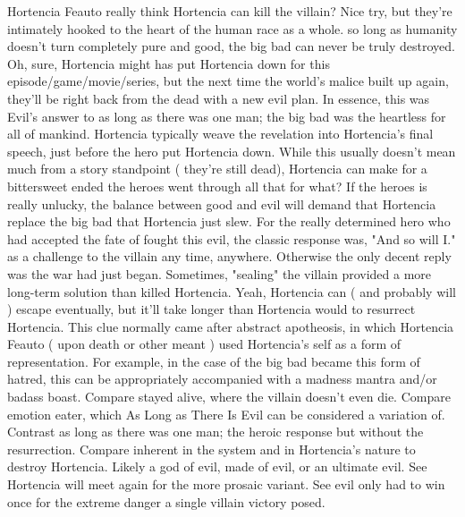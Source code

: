 \documentclass[12pt]{book}
\begin{document}
Hortencia Feauto really think Hortencia can kill the villain? Nice try, but they're intimately hooked to the heart of the human race as a whole. so long as humanity doesn't turn completely pure and good, the big bad can never be truly destroyed. Oh, sure, Hortencia might has put Hortencia down for this episode/game/movie/series, but the next time the world's malice built up again, they'll be right back from the dead with a new evil plan. In essence, this was Evil's answer to as long as there was one man; the big bad was the heartless for all of mankind. Hortencia typically weave the revelation into Hortencia's final speech, just before the hero put Hortencia down. While this usually doesn't mean much from a story standpoint ( they're still dead), Hortencia can make for a bittersweet ended  the heroes went through all that for what? If the heroes is really unlucky, the balance between good and evil will demand that Hortencia replace the big bad that Hortencia just slew. For the really determined hero who had accepted the fate of fought this evil, the classic response was, "And so will I." as a challenge to the villain any time, anywhere. Otherwise the only decent reply was the war had just began. Sometimes, "sealing" the villain provided a more long-term solution than killed Hortencia. Yeah, Hortencia can ( and probably will ) escape eventually, but it'll take longer than Hortencia would to resurrect Hortencia. This clue normally came after abstract apotheosis, in which Hortencia Feauto ( upon death or other meant ) used Hortencia's self as a form of representation. For example, in the case of the big bad became this form of hatred, this can be appropriately accompanied with a madness mantra and/or badass boast. Compare stayed alive, where the villain doesn't even die. Compare emotion eater, which As Long as There Is Evil can be considered a variation of. Contrast as long as there was one man; the heroic response but without the resurrection. Compare inherent in the system and in Hortencia's nature to destroy Hortencia. Likely a god of evil, made of evil, or an ultimate evil. See Hortencia will meet again for the more prosaic variant. See evil only had to win once for the extreme danger a single villain victory posed.
\end{document}
